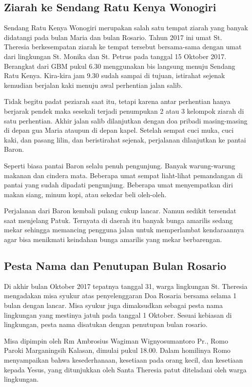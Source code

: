 \subsection*{Ziarah ke Sendang Ratu Kenya Wonogiri}
Sendang Ratu Kenya Wonogiri merupakan salah satu tempat ziarah yang banyak didatangi pada bulan Maria dan bulan Rosario. Tahun 2017 ini umat St. Theresia berkesempatan ziarah ke tempat tersebut bersama-sama dengan umat dari lingkungan St. Monika dan St. Petrus pada tanggal 15 Oktober 2017. Berangkat dari GBM pukul 6.30 menggunakan bis langsung menuju Sendang Ratu Kenya. Kira-kira jam 9.30 sudah sampai di tujuan, istirahat sejenak kemudian berjalan kaki menuju awal perhentian jalan salib. 

Tidak begitu padat peziarah saat itu, tetapi karena antar perhentian hanya berjarak pendek maka sesekali terjadi penumpukan 2 atau 3 kelompok ziarah di satu perhentian. Akhir jalan salib dilanjutkan dengan doa pribadi masing-masing di depan gua Maria ataupun di depan kapel. 
Setelah sempat cuci muka, cuci kaki, dan pasang lilin, dan beristirahat sejenak, perjalanan dilanjutkan ke pantai Baron. 

Seperti biasa pantai Baron selalu penuh pengunjung. Banyak warung-warung makanan dan cindera mata. Beberapa umat sempat liaht-lihat pemandangan di pantai yang sudah dipadati pengunjung. Beberapa umat menyempatkan diri makan siang, minum kopi, atau sekedar beli oleh-oleh.

Perjalanan dari Baron kembali pulang cukup lancar. Namun sedikit tersendat saat menjelang Patuk. Ternyata di daerah itu banyak bunga amarilis sedang mekar sehingga memancing pengguna jalan untuk memperlambat kendaraannya agar bisa menikmati keindahan bunga amarilis yang mekar berbarengan.

\subsection*{Pesta Nama dan Penutupan Bulan  Rosario}
Di akhir bulan Oktober 2017 tepatnya tanggal 31, warga lingkungan St. Theresia mengadakan misa syukur atas penyelenggaran Doa Rosaria bersama selama 1 bulan dengan lancar. Misa syukur juga dimaksudkan sebagai pesta nama lingkungan yang mestinya jatuh pada tanggal 1 Oktober. Sesuai kebiasan di lingkungan, pesta nama disatukan dengan penutupan bulan rosario. 

Misa dipimpin oleh Rm Ambrosius Wagiman Wignyosumantoro Pr., Romo Paroki Marganingsih Kalasan, dimulai pukul 18.00. Dalam homilinya Romo menyampaikan bahwa kesederhanaan, kesetiaan pada orang kecil, dan kesetiaan kepada Yesus, yang ditunjukkan oleh Santa Theresia patut diteladani oleh warga lingkungan.

